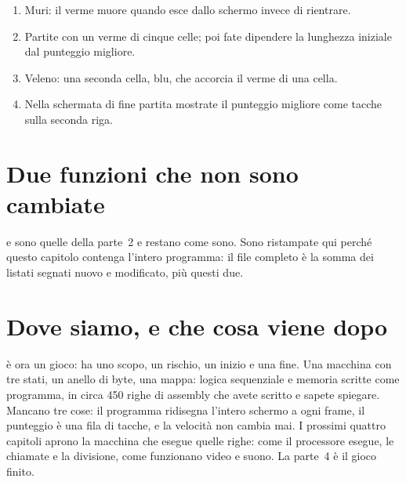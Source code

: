 \begin{exercise}[su \prg]
\begin{enumerate}[nosep]
\item Muri: il verme muore quando esce dallo schermo invece di rientrare.
\item Partite con un verme di cinque celle; poi fate dipendere la lunghezza
  iniziale dal punteggio migliore.
\item Veleno: una seconda cella, blu, che accorcia il verme di una cella.
\item Nella schermata di fine partita mostrate il punteggio migliore come
  tacche sulla seconda riga.
\end{enumerate}
\end{exercise}

\section{Due funzioni che non sono cambiate}

 e  sono quelle della parte~2 e restano come
sono. Sono ristampate qui perché questo capitolo contenga l'intero programma:
il file completo è la somma dei listati segnati nuovo e modificato, più questi
due.



\section{Dove siamo, e che cosa viene dopo}

\vermone è ora un gioco: ha uno scopo, un rischio, un inizio e una fine. Una
macchina con tre stati, un anello di byte, una mappa: logica sequenziale e
memoria scritte come programma, in circa 450 righe di assembly che avete
scritto e sapete spiegare. Mancano tre cose: il programma ridisegna l'intero
schermo a ogni frame, il punteggio è una fila di tacche, e la velocità non
cambia mai. I prossimi quattro capitoli aprono la macchina che esegue quelle
righe: come il processore esegue, le chiamate e la divisione, come funzionano
video e suono. La parte~4 è il gioco finito.
